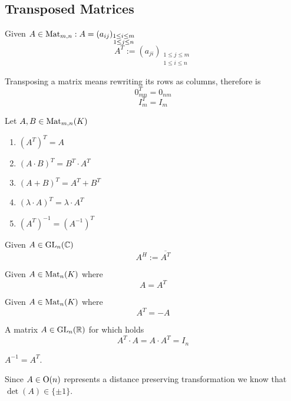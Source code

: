 \subsection{Transposed Matrices}
\begin{definition}
   Given \(A \in \operatorname{Mat}_{m,n}: A = (a_{ij})_{\substack{1 \leq i \leq m \\ 1 \leq j \leq n}}\)
   \[A^T := (a_{ji})_{\substack{1 \leq j \leq m \\ 1 \leq i \leq n}}\]
\end{definition}
\begin{remark}
   Transposing a matrix means rewriting its rows as columns, therefore is
   \[0_{mn}^T = 0_{nm}\]
   \[I_{m}^T = I_{m}\]
\end{remark}

\begin{proposition}
   Let \(A,B \in \operatorname{Mat}_{m,n}(K)\)
   \begin{enumerate}[label=\roman*, align=Center]
      \item \((A^T)^T = A\)
      \item \((A \cdot B)^T = B^T \cdot A^T\)
      \item \((A + B)^T = A^T + B^T\)
      \item \((\lambda \cdot A)^T = \lambda \cdot A^T\)
      \item \((A^T)^{-1} = (A^{-1})^T\)
   \end{enumerate}
\end{proposition}

\begin{definition}
   Given \(A \in \operatorname{GL}_n(\mathbb{C})\)
   \[A^H := \overline{A^T}\]
\end{definition}

\begin{definition}
   Given \(A \in \operatorname{Mat}_n(K)\) where
   \[A = A^T\]
\end{definition}

\begin{definition}
   Given \(A \in \operatorname{Mat}_n(K)\) where
   \[A^T = -A\]
\end{definition}

\begin{definition}
   A matrix \(A \in \operatorname{GL}_n(\mathbb{R})\) for which holds
   \[A^T \cdot A = A \cdot A^T = I_n\]
\end{definition}
\begin{remark}[Intuition]
   \(A^{-1} = A^T\).
\end{remark}
\begin{remark}
   Since \(A \in \operatorname{O}(n)\) represents a distance preserving transformation we know that \(\det(A) \in \{\pm 1\}\).
\end{remark}

